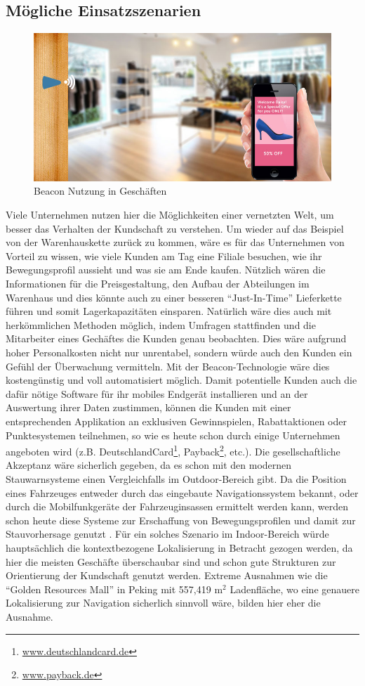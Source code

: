 \subsection{Mögliche Einsatzszenarien}
\begin{figure} 
\centering
\includegraphics[scale=0.3]{Bilder/iBeaconShoe}
\caption{Beacon Nutzung in Geschäften \cite{Shoe}}
\label{Nr5}
\end{figure}
Viele Unternehmen nutzen hier die Möglichkeiten einer vernetzten Welt, um besser das Verhalten der Kundschaft zu verstehen. Um wieder auf das Beispiel von der Warenhauskette zurück zu kommen, wäre es für das Unternehmen von Vorteil zu wissen, wie viele Kunden am Tag eine Filiale besuchen, wie ihr Bewegungsprofil aussieht und was sie am Ende kaufen. Nützlich wären die Informationen für die Preisgestaltung, den Aufbau der Abteilungen im Warenhaus und dies könnte auch zu einer besseren "`Just-In-Time"' Lieferkette führen und somit Lagerkapazitäten einsparen. Natürlich wäre dies auch mit herkömmlichen Methoden möglich, indem Umfragen stattfinden und die Mitarbeiter eines Gechäftes die Kunden genau beobachten. Dies wäre aufgrund hoher Personalkosten nicht nur unrentabel, sondern würde auch den Kunden ein Gefühl der Überwachung vermitteln. Mit der Beacon-Technologie wäre dies kostengünstig und voll automatisiert möglich. Damit potentielle Kunden auch die dafür nötige Software für ihr mobiles Endgerät installieren und an der Auswertung ihrer Daten zustimmen, können die Kunden mit einer entsprechenden Applikation an exklusiven Gewinnspielen, Rabattaktionen oder Punktesystemen teilnehmen, so wie es heute schon durch einige Unternehmen angeboten wird (z.B. DeutschlandCard\footnote{\url{www.deutschlandcard.de}}, Payback\footnote{\url{www.payback.de}}, etc.). Die gesellschaftliche Akzeptanz wäre sicherlich gegeben, da es schon mit den modernen Stauwarnsysteme einen Vergleichfalls im Outdoor-Bereich gibt. Da die Position eines Fahrzeuges entweder durch das eingebaute Navigationssystem bekannt, oder durch die Mobilfunkgeräte der Fahrzeuginsassen ermittelt werden kann, werden schon heute diese Systeme zur Erschaffung von Bewegungsprofilen und damit zur Stauvorhersage genutzt \cite{Stau}. Für ein solches Szenario im Indoor-Bereich würde hauptsächlich die kontextbezogene Lokalisierung in Betracht gezogen werden, da hier die meisten Geschäfte überschaubar sind und schon gute Strukturen zur Orientierung der Kundschaft genutzt werden. Extreme Ausnahmen wie die "`Golden Resources Mall"' in Peking mit 557,419 $\text{m}^2$ Ladenfläche, wo eine genauere Lokalisierung zur Navigation sicherlich sinnvoll wäre, bilden hier eher die Ausnahme. \par\bigskip
